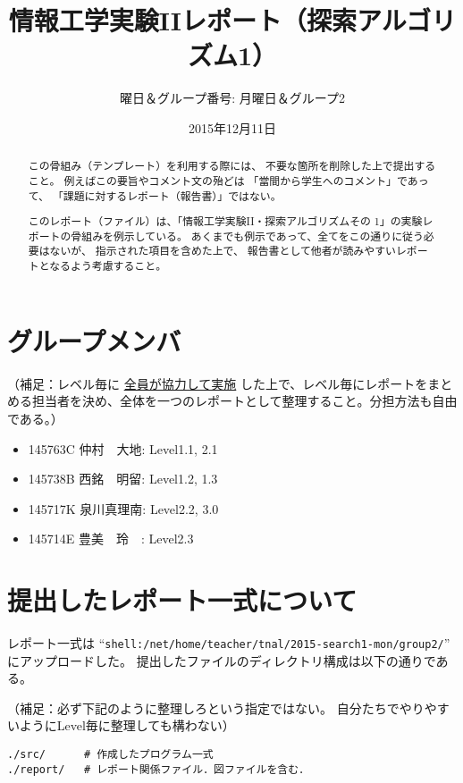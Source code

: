 \documentclass[10pt]{jarticle}
\begin{document}
\title{情報工学実験IIレポート（探索アルゴリズム1）}
\author{曜日＆グループ番号: 月曜日＆グループ2} %
\date{2015年12月11日}

\maketitle

\begin{abstract}
この骨組み（テンプレート）を利用する際には、
不要な箇所を削除した上で提出すること。
例えばこの要旨やコメント文の殆どは
「當間から学生へのコメント」であって、
「課題に対するレポート（報告書）」ではない。

このレポート（ファイル）は、「情報工学実験II・探索アルゴリズムその
1\cite{info2-search1}」の実験レポートの骨組みを例示している。
あくまでも例示であって、全てをこの通りに従う必要はないが、
指示された項目を含めた上で、
報告書として他者が読みやすいレポートとなるよう考慮すること。
\end{abstract}

\section*{グループメンバ}
（補足：レベル毎に \underline{全員が協力して実施} した上で、レベル毎にレポートをまとめる担当者を決め、全体を一つのレポートとして整理すること。分担方法も自由である。）
\begin{itemize}
	\item 145763C 仲村　大地: Level1.1, 2.1
	\item 145738B 西銘　明留: Level1.2, 1.3
	\item 145717K 泉川真理南: Level2.2, 3.0
	\item 145714E 豊美　玲　: Level2.3 
\end{itemize}

\section*{提出したレポート一式について}
レポート一式は
``\verb|shell:/net/home/teacher/tnal/2015-search1-mon/group2/|''
にアップロードした。
提出したファイルのディレクトリ構成は以下の通りである。

\vspace{+0.5cm}
（補足：必ず下記のように整理しろという指定ではない。
自分たちでやりやすいようにLevel毎に整理しても構わない）
\begin{breakbox}
\begin{verbatim}
./src/      # 作成したプログラム一式
./report/   # レポート関係ファイル．図ファイルを含む．
\end{verbatim}
\end{breakbox}
\end{document}
